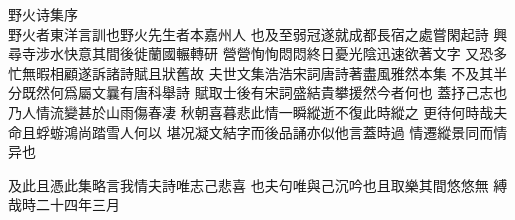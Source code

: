\documentclass[a4j,12pt]{ltjtarticle}
\begin{document}
\renewcommand{\thepage}{{\kaiti\zhnumber{\arabic{page}}}}
\setcounter{page}{1}

	\Huge 野火诗集序 \\

	\Large
		野火者東洋言訓也野火先生者本嘉州人
	也及至弱冠遂就成都長宿之處嘗閑起詩
	興尋寺涉水快意其間後徙蘭國輾轉研
	營營恂恂悶悶終日憂光陰迅速欲著文字
	又恐多忙無暇相顧遂訴諸詩賦且狀舊故
	夫世文集浩浩宋詞唐詩著盡風雅然本集
	不及其半分既然何爲屬文曩有唐科舉詩
	賦取士後有宋詞盛結貴攀援然今者何也
	蓋抒己志也乃人情流變甚於山雨傷春凄
	秋朝喜暮悲此情一瞬縱逝不復此時縱之
	更待何時哉夫命且蜉蝣鴻尚踏雪人何以
	堪况凝文結字而後品誦亦似他言蓋時過
	情遷縱景同而情异也

	及此且憑此集略言我情夫詩唯志己悲喜
	也夫句唯與己沉吟也且取樂其間悠悠無
	縛哉時二十四年三月
	
		
	\newpage
		
	\tableofcontents
	
\end{document}
